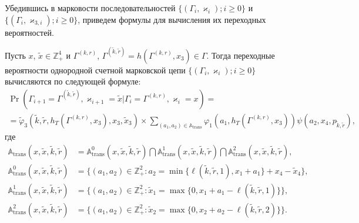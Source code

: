 \documentclass[a4paper,12pt,russian]{extarticle}
\newcommand{\Mark}{\{(\Gamma_i, \varkappa_i); i \geqslant 0\}}
\newcommand{\MarkThree}{\{(\Gamma_i, \varkappa_{3,i}); i \geqslant 0\}}
\begin{document}
Убедившись в марковости последовательностей $\Mark$ и $\MarkThree$, приведем формулы для вычисления их переходных вероятностей. 
\begin{theorem}
Пусть $x$, $\tilde{x}\in \mathbb{Z}_+^4$ и $\Gamma^{(k,r)}$, $\Gamma^{(\tilde{k},\tilde{r})}=h(\Gamma^{(k,r)},x_3) \in \Gamma$. Тогда переходные вероятности однородной счетной марковской цепи $\Mark$ вычисляются по следующей формуле:
\begin{multline}
\Pr (\Gamma_{i+1}=\Gamma^{(\tilde{k},\tilde{r})},\varkappa_{i+1}=\tilde{x} | \Gamma_{i}=\Gamma^{(k,r)},\varkappa_i=x)=\\ 
=\widetilde{\varphi}_3(\tilde{k},\tilde{r},h_T(\Gamma^{(k,r)},x_3),x_3,\tilde{x}_3)\times
\sum_{(a_1,a_2)\in {\mathbb A}_{\mathrm{trans}}}\varphi_1(a_1,h_T(\Gamma^{(k,r)},x_3))  \psi(a_2,x_4, p_{\tilde{k},\tilde{r}}),
\label{transitionToProve}
\end{multline}
где 
\begin{align*}
{\mathbb A}_{\mathrm{trans}}(x,\tilde{x},\tilde{k},\tilde{r}) &= {\mathbb A}_{\mathrm{trans}}^0(x,\tilde{x},\tilde{k},\tilde{r}) \bigcap {\mathbb A}_{\mathrm{trans}}^1(x,\tilde{x},\tilde{k},\tilde{r})\bigcap {\mathbb A}_{\mathrm{trans}}^2(x,\tilde{x},\tilde{k},\tilde{r}),\\
{\mathbb A}_{\mathrm{trans}}^0(x,\tilde{x},\tilde{k},\tilde{r}) &= \{(a_1,a_2) \in \mathbb{Z}_+^2 \colon a_2 = \min{\{\ell(\tilde{k},\tilde{r},1), x_1+a_1}\} +x_4-\tilde{x}_4\},\\
{\mathbb A}_{\mathrm{trans}}^1(x,\tilde{x},\tilde{k},\tilde{r}) &= \{(a_1,a_2) \in \mathbb{Z}_+^2 \colon \tilde{x}_1=\max{\{0,x_1+a_1-\ell(\tilde{k},\tilde{r},1)\}}\},\\
{\mathbb A}_{\mathrm{trans}}^2(x,\tilde{x},\tilde{k},\tilde{r}) &= \{(a_1,a_2) \in \mathbb{Z}_+^2 \colon  \tilde{x}_2=\max{\{0,x_2+a_2-\ell(\tilde{k},\tilde{r},2)\}}\}.
\end{align*}
\end{theorem}
\end{document}
